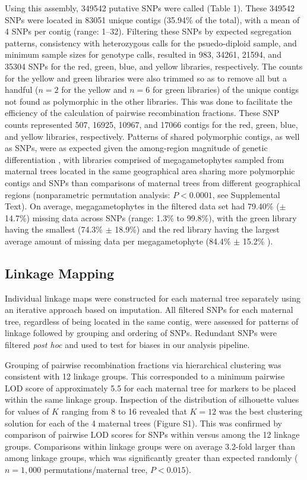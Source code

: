 \documentclass[smallextended]{svjour3}
\begin{document}
Using this assembly, \num{349542} putative SNPs were called (Table 1). These
\num{349542} SNPs were located in \num{83051} unique contigs (35.94\% of the
total), with a mean of \num{4} SNPs per contig (range:
\SIrange{1}{32}{}). Filtering these SNPs by expected segregation patterns,
consistency with heterozygous calls for the psuedo-diploid sample, and minimum
sample sizes for genotype calls, resulted in \num{983}, \num{34261},
\num{21594}, and \num{35304} SNPs for the red, green, blue, and yellow
libraries, respectively. The counts for the yellow and green libraries were also
trimmed so as to remove all but a handful ($n = 2$ for the yellow and $n = 6$
for green libraries) of the unique contigs not found as polymorphic in the other
libraries. This was done to facilitate the efficiency of the calculation of
pairwise recombination fractions. These SNP counts represented \num{507},
\num{16925}, \num{10967}, and \num{17066} contigs for the red, green, blue, and
yellow libraries, respectively. Patterns of shared polymorphic contigs, as well
as SNPs, were as expected given the among-region magnitude of genetic
differentiation \citep[Figure 2, see][]{Eckert:2008}, with libraries comprised
of megagametophytes sampled from maternal trees located in the same geographical
area sharing more polymorphic contigs and SNPs than comparisons of maternal
trees from different geographical regions (nonparametric permutation analysis:
$P < 0.0001$, see Supplemental Text).  On average, megagametophytes in the
filtered data set had 79.40\% ($\pm$ 14.7\%) missing data across SNPs (range:
1.3\% to 99.8\%), with the green library having the smallest (74.3\% $\pm$
18.9\%) and the red library having the largest average amount of missing data
per megagametophyte (84.4\% $\pm$ 15.2\% ).

\subsection*{Linkage Mapping}

Individual linkage maps were constructed for each maternal tree separately using
an iterative approach based on imputation. All filtered SNPs for each maternal
tree, regardless of being located in the same contig, were assessed for patterns
of linkage followed by grouping and ordering of SNPs. Redundant SNPs were
filtered \textit{post hoc} and used to test for biases in our analysis pipeline.

Grouping of pairwise recombination fractions via hierarchical clustering was
consistent with \num{12} linkage groups.  This corresponded to a minimum
pairwise LOD score of approximately 5.5 for each maternal tree for markers to be
placed within the same linkage group.  Inspection of the distribution of
silhouette values for values of $K$ ranging from \num{8} to \num{16} revealed
that $K = 12$ was the best clustering solution for each of the \num{4} maternal
trees (Figure S1). This was confirmed by comparison of pairwise LOD scores for
SNPs within versus among the \num{12} linkage groups. Comparisons within linkage
groups were on average 3.2-fold larger than among linkage groups, which was
significantly greater than expected randomly ($n = 1,000$ permutations/maternal
tree, $P < 0.015$).
\end{document}
